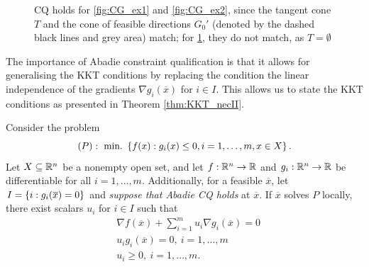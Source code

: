 \begin{figure}
\begin{subfigure}{0.4\textwidth}
			\caption{ }\label{fig:CG_ex3}
		\end{subfigure}
		\caption{CQ holds for \ref{fig:CG_ex1} and \ref{fig:CG_ex2}, since the tangent cone $T$ and the cone of feasible directions $G_0'$ (denoted by the dashed black lines and grey area) match; for \ref{fig:CG_ex3}, they do not match, as $T = \emptyset$}\label{fig:CQ-Tangent} \label{fig:CQ-Tangent}	
	\end{figure}


The importance of Abadie constraint qualification is that it allows for generalising the KKT conditions by replacing the condition the linear independence of the gradients $\nabla g_i(\overline{x})$ for $i \in I$. This allows us to state the KKT conditions as presented in Theorem \ref{thm:KKT_necII}.

\begin{theorem} \label{thm:KKT_necII}
%
Consider the problem
$$(P) :~ \mathop{\text{min.~}} \left\{ f(x) : g_i(x) \leq 0, i=1,\dots,m, x \in X \right \}.$$
Let $X \subseteq \mathbb{R}^n$ be a nonempty open set, and let $f:\mathbb{R}^n \rightarrow \mathbb{R}$ and $g_i:\mathbb{R}^n \rightarrow \mathbb{R}$ be differentiable for all $i = 1, \dots,m$. Additionally, for a feasible $\overline{x}$, let $I = \left\{ i : g_i(\overline{x}) = 0 \right \}$ and \emph{suppose that Abadie CQ holds} at $\overline{x}$. If $\overline{x}$ solves $P$ locally, there exist scalars $u_i$ for $i \in I$ such that
\begin{align*}
& \nabla f(\overline{x}) + \sum_{i=1}^m u_i \nabla g_i(\overline{x}) = 0\\
& u_i g_i(\overline{x}) = 0, \ i = 1,\dots, m\\
&u_i \geq 0, \ i = 1, \dots, m. 
\end{align*}
%
\end{theorem}

